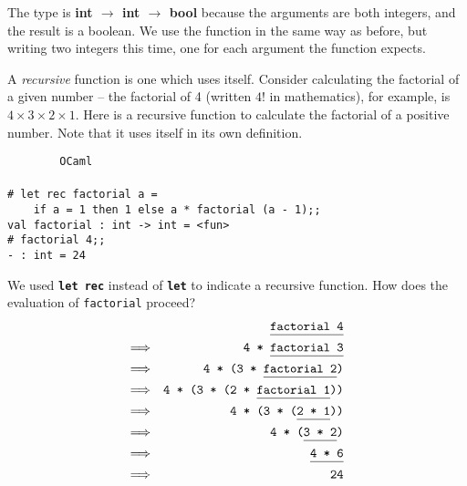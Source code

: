\documentclass[]{book}
\newcommand{\smspace}{\vspace{4mm}}
\begin{document}
\noindent The type is \textsf{\textbf{int $\rightarrow$ int $\rightarrow$ bool}} because the arguments are both integers, and the result is a boolean. We use the function in the same way as before, but writing two integers this time, one for each argument the function expects.

A \textit{recursive} function is one which uses itself. Consider calculating the factorial of a given number -- the factorial of 4 (written $4!$ in mathematics), for example, is $4\times3\times2\times1$. Here is a recursive function to calculate the factorial of a positive number. Note that it uses itself in its own definition.

\smspace
\noindent\verb!        OCaml!\\
\noindent\\
\noindent\verb!# let rec factorial a =!\\
\noindent\verb!    if a = 1 then 1 else a * factorial (a - 1);;!\\
\noindent\verb!val factorial : int -> int = <fun>!\\
\noindent\texttt{\# factorial 4;;}\\
\noindent\verb!- : int = 24!
\smspace

\noindent We used \textbf{\texttt{let\!\! rec}} instead of \textbf{\texttt{let}} to indicate a recursive function.  How does the evaluation of \texttt{factorial} proceed?
\begin{eqnarray*}
 & & \texttt{\underline{\vphantom{g}factorial 4}} \\
 \Longrightarrow & & \texttt{4 * \underline{\vphantom{g}factorial 3}} \\
 \Longrightarrow & & \texttt{4 * (3 * \underline{\vphantom{g}factorial 2})} \\
 \Longrightarrow & & \texttt{4 * (3 * (2 * \underline{\vphantom{g}factorial 1}))}\\
 \Longrightarrow & & \texttt{4 * (3 * (\underline{\vphantom{g}2 * 1}))}\\
 \Longrightarrow & & \texttt{4 * (\underline{\vphantom{g}3 * 2})}\\
 \Longrightarrow & & \texttt{\underline{\vphantom{g}4 * 6}} \\
 \Longrightarrow & & \verb!24!
\end{eqnarray*}
\end{document}
